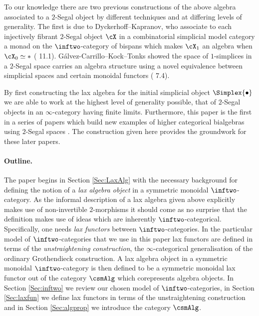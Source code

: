 \documentclass[a4paper]{article}
\numberwithin{equation}{section}
\begin{document}
To our knowledge there are two previous constructions of the above algebra associated to a $2$-Segal object by different techniques and at differing levels of generality. The first is due to Dyckerhoff--Kapranov, who associate to each injectively fibrant $2$-Segal object $\cX$ in a combinatorial simplicial model category a monad on the $\inftwo$-category of bispans which makes $\cX_1$ an algebra when $\cX_0\simeq \ast$ (\cite{DK12} 11.1). G\'alvez-Carrillo--Kock--Tonks showed the space of $1$-simplices in a $2$-Segal space carries an algebra structure using a novel equivalence between simplicial spaces and certain monoidal functors (\cite{KockI} 7.4).

By first constructing the lax algebra for the initial simplicial object $\Simplex{\bullet}$ we are able to work at the highest level of generality possible, that of $2$-Segal objects in an $\infty$-category having finite limits. Furthermore, this paper is the first in a series of papers which build new examples of higher categorical bialgebras using $2$-Segal spaces \cite{penney2017bialg, penney2017bimon}. The construction given here provides the groundwork for these later papers.


\paragraph{Outline.} The paper begins in Section \ref{Sec:LaxAlg} with the necessary background for defining the notion of a {\em lax algebra object} in a symmetric monoidal $\inftwo$-category. As the informal description of a lax algebra given above explicitly makes use of non-invertible $2$-morphisms it should come as no surprise that the definition makes use of ideas which are inherently $\inftwo$-categorical. Specifically, one needs {\em lax functors} between $\inftwo$-categories. In the particular model of $\inftwo$-categories that we use in this paper lax functors are defined in terms of the {\em unstraightening construction}, the $\infty$-categorical generalisation of the ordinary Grothendieck construction. A lax algebra object in a symmetric monoidal $\inftwo$-category is then defined to be a symmetric monoidal lax functor out of the category $\csmAlg$ which corepresents algebra objects. In Section \ref{Sec:inftwo} we review our chosen model of $\inftwo$-categories, in Section \ref{Sec:laxfun} we define lax functors in terms of the unstraightening construction and in Section \ref{Sec:algprop} we introduce the category $\csmAlg$.
\end{document}
